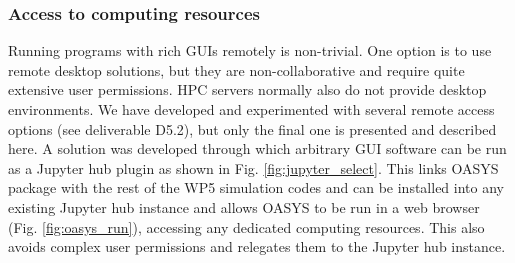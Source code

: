 \documentclass[11pt, a4paper]{article}
\begin{document}
\subsubsection{Access to computing resources}
\label{sec:docker}

Running programs with rich GUIs remotely is non-trivial. One option is to use remote desktop solutions, but they are non-collaborative and require quite extensive user permissions. HPC servers normally also do not provide desktop environments. We have developed and experimented with several remote access options (see deliverable D5.2), but only the final one is presented and described here. A solution was developed through which arbitrary GUI software can be run as a Jupyter hub plugin as shown in Fig. \ref{fig:jupyter_select}. This links OASYS package with the rest of the WP5 simulation codes and can be installed into any existing Jupyter hub instance and allows OASYS to be run in a web browser (Fig. \ref{fig:oasys_run}), accessing any dedicated computing resources. This also avoids complex user permissions and relegates them to the Jupyter hub instance.
\end{document}
